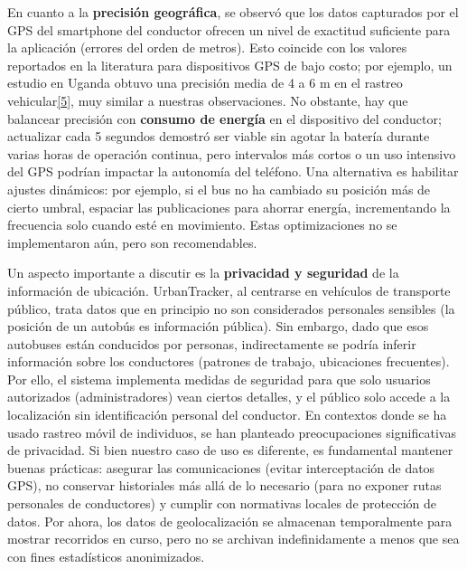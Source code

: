 \documentclass[
]{article}
\begin{document}
En cuanto a la \textbf{precisión geográfica}, se observó que los datos
capturados por el GPS del smartphone del conductor ofrecen un nivel de
exactitud suficiente para la aplicación (errores del orden de metros).
Esto coincide con los valores reportados en la literatura para
dispositivos GPS de bajo costo; por ejemplo, un estudio en Uganda obtuvo
una precisión media de 4 a 6 m en el rastreo
vehicular\href{https://fliphtml5.com/lqsof/cdpg/Art\%C3\%ADculos/\#:~:text=sistema,a\%206\%20metros\%2C\%20una\%20latencia}{{[}5{]}},
muy similar a nuestras observaciones. No obstante, hay que balancear
precisión con \textbf{consumo de energía} en el dispositivo del
conductor; actualizar cada 5 segundos demostró ser viable sin agotar la
batería durante varias horas de operación continua, pero intervalos más
cortos o un uso intensivo del GPS podrían impactar la autonomía del
teléfono. Una alternativa es habilitar ajustes dinámicos: por ejemplo,
si el bus no ha cambiado su posición más de cierto umbral, espaciar las
publicaciones para ahorrar energía, incrementando la frecuencia solo
cuando esté en movimiento. Estas optimizaciones no se implementaron aún,
pero son recomendables.

Un aspecto importante a discutir es la \textbf{privacidad y seguridad}
de la información de ubicación. UrbanTracker, al centrarse en vehículos
de transporte público, trata datos que en principio no son considerados
personales sensibles (la posición de un autobús es información pública).
Sin embargo, dado que esos autobuses están conducidos por personas,
indirectamente se podría inferir información sobre los conductores
(patrones de trabajo, ubicaciones frecuentes). Por ello, el sistema
implementa medidas de seguridad para que solo usuarios autorizados
(administradores) vean ciertos detalles, y el público solo accede a la
localización sin identificación personal del conductor. En contextos
donde se ha usado rastreo móvil de individuos, se han planteado
preocupaciones significativas de privacidad. Si bien nuestro caso de uso
es diferente, es fundamental mantener buenas prácticas: asegurar las
comunicaciones (evitar interceptación de datos GPS), no conservar
historiales más allá de lo necesario (para no exponer rutas personales
de conductores) y cumplir con normativas locales de protección de datos.
Por ahora, los datos de geolocalización se almacenan temporalmente para
mostrar recorridos en curso, pero no se archivan indefinidamente a menos
que sea con fines estadísticos anonimizados.
\end{document}
